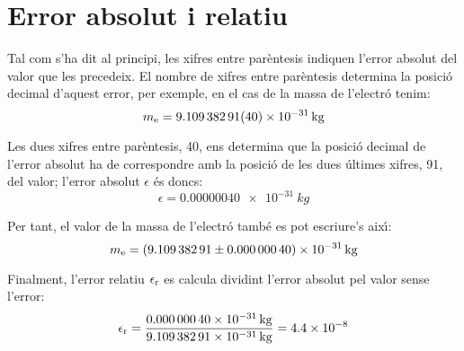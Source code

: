 \section{Error absolut i relatiu}\label{err_abs_rel}

Tal com s'ha dit al principi, les xifres entre par\`{e}ntesis indiquen l'error absolut del valor que les precedeix. El nombre de xifres entre par\`{e}ntesis determina la posici\'{o} decimal d'aquest error, per exemple, en el cas de la  massa de l'electr\'{o} tenim:
\[
    m\ped{e} = \SI{9,10938291(40) e-31}{kg}
\]

Les dues xifres entre par\`{e}ntesis, 40, ens determina que la posici\'{o} decimal de l'error absolut ha de correspondre amb la posici\'{o} de les dues \'{u}ltimes xifres, 91, del valor; l'error absolut $\epsilon$  \'{e}s doncs:
\[
    \epsilon = \SI{0,00000040 e-31}{kg}
\]

Per tant, el valor de la massa de l'electr\'{o} tamb\'{e} es pot escriure's aix\'{\i}:
 \[
    m\ped{e} = \SI[separate-uncertainty]{9,10938291(40) e-31}{kg}
\]

Finalment, l'error relatiu $\epsilon\ped{r}$ es calcula dividint l'error absolut pel valor sense l'error:
\[
    \epsilon\ped{r} = \frac{\SI{0,00000040 e-31}{kg}}{\SI{9,10938291 e-31}{kg}} =   \num{4,4e-8}
\]
